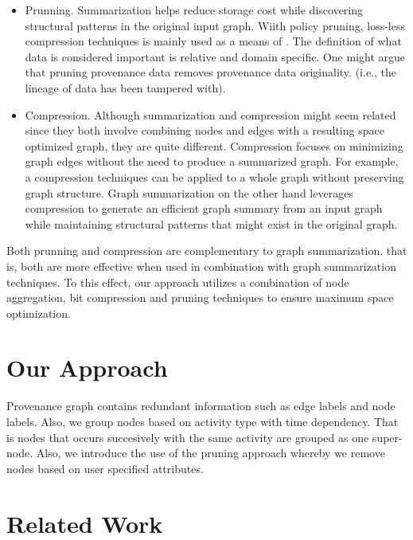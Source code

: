 \begin{itemize}

\item Prunning. Summarization helps reduce storage cost while discovering structural patterns in the original input graph. Wiith policy pruning, loss-less compression techniques is mainly used as a means of . The definition of what data is considered important is relative and domain specific. One might argue that pruning provenance data removes provenance data originality. (i.e., the lineage of data has been tampered with). 

\item Compression. Although summarization and compression might seem related since they both involve combining nodes and edges with a resulting space optimized graph, they are quite different. Compression focuses on minimizing graph edges without the need to produce a summarized graph. For example, a compression techniques can be applied to a whole graph without preserving graph structure. Graph summarization on the other hand leverages compression to generate an efficient graph summary from an input graph while maintaining structural patterns that might exist in the original graph.

\end{itemize}


\par Both prunning and compression are complementary to graph summarization. that is, both are more effective when used in combination with graph summarization techniques. To this effect, our approach utilizes a combination of node aggregation, bit compression and pruning techniques to ensure maximum space optimization.


\section{Our Approach}

Provenance graph contains redundant information such as edge labels and node labels. Also, we group nodes based on activity type with time dependency. That is nodes that occurs succesively with the same activity are grouped as one super-node. Also, we introduce the use of the pruning approach whereby we remove nodes based on user specified attributes.



\section{Related Work}


